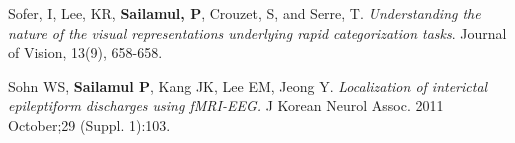 \documentclass[master,english,final]{kaist-ucs}
\begin{document}
    \begin{publication}
             
             \item Sofer, I, Lee, KR, \textbf{Sailamul, P}, Crouzet, S, and Serre, T. \textit{Understanding the nature of the visual representations underlying rapid categorization tasks}. Journal of Vision, 13(9), 658-658.\\

\item Sohn WS, \textbf{Sailamul P}, Kang JK, Lee EM, Jeong Y.  \textit{Localization of interictal epileptiform discharges using fMRI-EEG.} J Korean Neurol Assoc. 2011 October;29 (Suppl. 1):103.\\	

    \end{publication}

\end{document}

